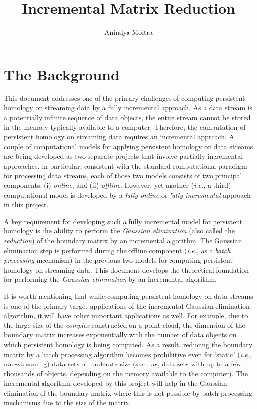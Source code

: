 \documentclass[11pt]{article}
\author{Anindya Moitra}
\title{Incremental Matrix Reduction}
\date{\vspace{-5ex}}
\begin{document}
	

\maketitle

\section{The Background}

This document addresses one of the primary challenges of computing persistent homology on streaming 
data by a fully incremental approach.  As a data stream is a potentially infinite sequence of data 
objects, the entire stream cannot be stored in the memory typically available to a computer.  
Therefore, the computation of persistent homology on streaming data requires an incremental 
approach.  A couple of computational models for applying persistent homology on data streams are 
being developed as two separate projects that involve partially incremental approaches.  In 
particular, consistent with the standard computational paradigm \cite{silva-13} for processing 
data streams, each of those two models consists of two principal components: (i) \emph{online}, and 
(ii) \emph{offline}.  However, yet another (\emph{i.e.}, a third) computational model is developed 
by a \emph{fully online} or \emph{fully incremental} approach in this project.


A key requirement for developing such a fully incremental model for persistent homology is the 
ability to perform the \emph{Gaussian elimination} (also called the \emph{reduction}) of the 
boundary matrix \cite{edelsbrunner-00, zomorodian-05} by an incremental algorithm.  The Gaussian 
elimination step is performed during the offline component (\emph{i.e.}, as a \emph{batch 
processing} mechanism) in the previous two models for computing persistent homology on streaming 
data.  This document develops the theoretical foundation for performing the \emph{Gaussian 
elimination} by an incremental algorithm.


It is worth mentioning that while computing persistent homology on data streams is one of the 
primary target applications of the incremental Gaussian elimination algorithm, it will have other 
important applications as well.  For example, due to the large size of the \emph{complex} 
constructed on a point cloud, the dimension of the boundary matrix increases exponentially with the 
number of data objects on which persistent homology is being computed.  As a result, reducing the 
boundary matrix by a batch processing algorithm becomes prohibitive even for `static' (\emph{i.e.}, 
non-streaming) data sets of moderate size (such as, data sets with up to a few thousands of 
objects, depending on the memory available to the computer).  The incremental algorithm developed 
by this project will help in the Gaussian elimination of the boundary matrix where this is 
not possible by batch processing mechanisms due to the size of the matrix.
\end{document}
